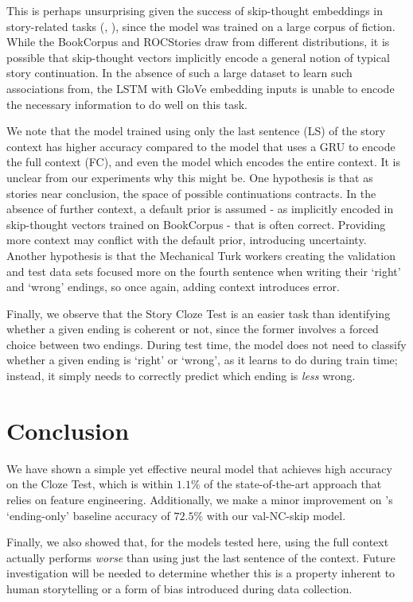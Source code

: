 \documentclass[11pt,a4paper]{article}
\begin{document}
This is perhaps unsurprising given the success of skip-thought embeddings in story-related tasks (\citet{Agrawal2016SortSS}, \citet{roemmele2017rnn}), since the model was trained on a large corpus of fiction. While the BookCorpus and ROCStories draw from different distributions, it is possible that skip-thought vectors implicitly encode a general notion of typical story continuation. In the absence of such a large dataset to learn such associations from, the LSTM with GloVe embedding inputs is unable to encode the necessary information to do well on this task.



We note that the model trained using only the last sentence (LS) of the story context has higher accuracy compared to the model that uses a GRU to encode the full context (FC), and even the \citet{Cai2017PayAT} model which encodes the entire context.
It is unclear from our experiments why this might be.
One hypothesis is that as stories near conclusion, the space of possible continuations contracts.
In the absence of further context, a default prior is assumed - as implicitly encoded in skip-thought vectors trained on BookCorpus - that is often correct. 
Providing more context may conflict with the default prior, introducing uncertainty.
Another hypothesis is that the Mechanical Turk workers creating the validation and test data sets focused more on the fourth sentence when writing their `right' and `wrong' endings, so once again, adding context introduces error.

Finally, we observe that the Story Cloze Test is an easier task than identifying whether a given ending is coherent or not, since the former involves a forced choice between two endings. During test time, the model does not need to classify whether a given ending is `right' or `wrong', as it learns to do during train time; instead, it simply needs to correctly predict which ending is \emph{less} wrong. 

\section{Conclusion}
\label{sec:length}
We have shown a simple yet effective neural model that achieves high accuracy on the Cloze Test, which is within $1.1\%$ of the state-of-the-art approach that relies on feature engineering. Additionally, we make a minor improvement on \citet{Cai2017PayAT}'s `ending-only' baseline accuracy of $72.5\%$ with our val-NC-skip model.
  
Finally, we also showed that, for the models tested here, using the full
context actually performs \emph{worse} than using just the last sentence of the context.
Future investigation will be needed to determine whether this is a property inherent to human storytelling or a form of bias introduced during data collection.
\end{document}

